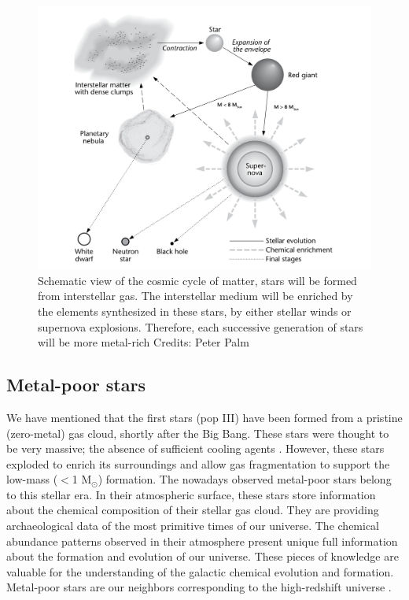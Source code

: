  

\begin{figure}[!ht]
\centering
\includegraphics[width=\textwidth, angle=0]{Img/star_cycle.png}
\caption{Schematic view of the cosmic cycle of matter, stars will be formed from interstellar gas. The interstellar medium will be enriched by the elements synthesized in these stars, by either stellar winds or supernova explosions. Therefore, each successive generation of stars will be more metal-rich Credits: Peter Palm} 
\label{star_cycle}
\end{figure}


\subsection{Metal-poor stars}

We have mentioned that the first stars (pop III) have been formed from a pristine (zero-metal) gas cloud, shortly after the Big Bang. These stars were thought to be very massive; the absence of sufficient cooling agents \citep[e.g.,][]{2002ApJ...564...23B}. However, these stars exploded to enrich its surroundings and allow gas fragmentation to support the low-mass ($<$1 M$_{\odot}$) formation. The nowadays observed metal-poor stars belong to this stellar era. In their atmospheric surface, these stars store information about the chemical composition of their stellar gas cloud. They are providing archaeological data of the most primitive times of our universe. The chemical abundance patterns observed in their atmosphere present unique full information about the formation and evolution of our universe. These pieces of knowledge are valuable for the understanding of the galactic chemical evolution and formation. Metal-poor stars are our neighbors corresponding to the high-redshift universe \citep[e.g.,][]{2019arXiv190401615S}.



